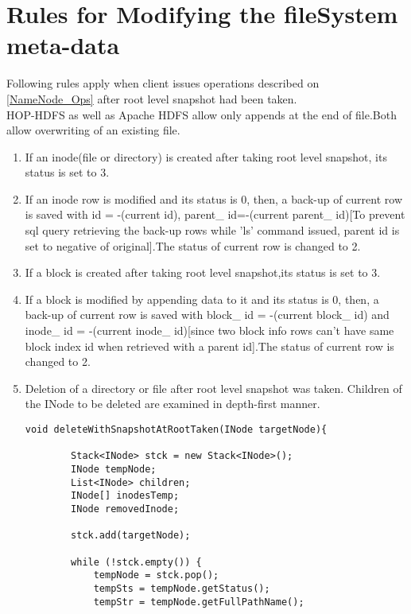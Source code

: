 \section{Rules for Modifying the fileSystem meta-data}
Following rules apply when client issues operations described on \ref{NameNode_Ops} after root level snapshot had been taken.\\
HOP-HDFS as well as Apache HDFS allow only appends at the end of file.Both allow overwriting of an existing file.
\begin{enumerate}
\item If an inode(file or directory) is created after taking root level snapshot, its status is set to 3.
\item If an inode row is modified and its status is 0, then, a back-up of current row is saved with id = -(current id), parent\_ id=-(current parent\_ id)[To prevent sql query retrieving the back-up rows while 'ls' command issued, parent id is set to negative of original].The status of current row is changed to 2.
\item If a block is created after taking root level snapshot,its status is set to 3.
\item If a block is modified by appending data to it and its status is 0, then, a back-up of current row is saved with block\_ id = -(current block\_ id) and inode\_ id = -(current inode\_ id)[since two block info rows can't have same block index id when retrieved with a parent id].The status of current row is changed to 2.
\item Deletion of a directory or file after root level snapshot was taken.
Children of the INode to be deleted are examined in depth-first manner.
\pagebreak
\begin{verbatim}
void deleteWithSnapshotAtRootTaken(INode targetNode){

        Stack<INode> stck = new Stack<INode>();
        INode tempNode;
        List<INode> children;
        INode[] inodesTemp;
        INode removedInode;

        stck.add(targetNode);

        while (!stck.empty()) {
            tempNode = stck.pop();
            tempSts = tempNode.getStatus();
            tempStr = tempNode.getFullPathName();
           

\end{verbatim}
\end{enumerate}
